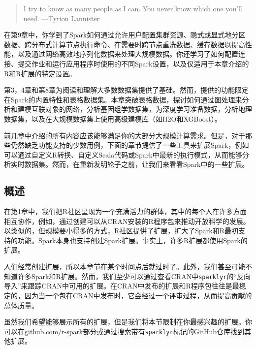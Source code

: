 \documentclass[
]{article}
\begin{document}
\begin{quote}
I try to know as many people as I can. You never know which one you'll
need. ---Tyrion Lannister
\end{quote}

在第9章中，你学到了Spark如何通过允许用户配置集群资源、隐式或显式地分区数据、跨分布式计算节点执行命令、在需要时跨节点重洗数据、缓存数据以提高性能，以及通过网络高效地序列化数据来处理大规模数据。你还学习了如何配置连接、提交作业和运行应用程序时使用的不同Spark设置，以及仅适用于本章介绍的R和R扩展的特定设置。

第3，4章和第8章为阅读和理解大多数数据集提供了基础。然而，提供的功能限定在Spark的内置特性和表格数据集。本章突破表格数据，探讨如何通过图处理来分析和建模互联对象的网络，分析基因组学数据集，为深度学习准备数据，分析地理数据集，以及在大规模数据集上使用高级建模库（如H2O和XGBoost）。

前几章中介绍的所有内容应该能够满足你的大部分大规模计算需求。但是，对于那些仍然缺乏功能支持的少数用例，下面的章节提供了一些工具来扩展Spark，例如可以通过自定义R转换、自定义Scala代码或Spark中最新的执行模式，从而能够分析实时数据集。然而，在重新发明轮子之前，让我们来看看Spark中的一些扩展。

\hypertarget{ux6982ux8ff0-9}{%
\subsection{概述}\label{ux6982ux8ff0-9}}

在第1章中，我们把R社区呈现为一个充满活力的群体，其中的每个人在许多方面相互协作，例如，通过创建可以从CRAN安装的R程序包来推动开放科学的发展。以类似的，但规模要小得多的方式，R社区提供了扩展，扩大了Spark和R最初支持的功能。Spark本身也支持创建Spark扩展。事实上，许多R扩展都使用Spark的扩展。

人们经常创建扩展，所以本章节在某个时间点后就过时了。此外，我们甚至可能不知道许多Spark和R扩展。然而，我们至少可以通过查看CRAN中\texttt{sparklyr}的``反向导入''来跟踪CRAN中可用的扩展。在CRAN中发布的扩展和R程序包往往是最稳定的，因为当一个包在CRAN中发布时，它会经过一个评审过程，从而提高贡献的总体质量。

虽然我们希望能够展示所有的扩展，但是我们将本节限制在你最感兴趣的扩展。你可以在github.com/r-spark部分或通过搜索带有\texttt{sparklyr}标记的GitHub仓库找到其他扩展。
\end{document}
